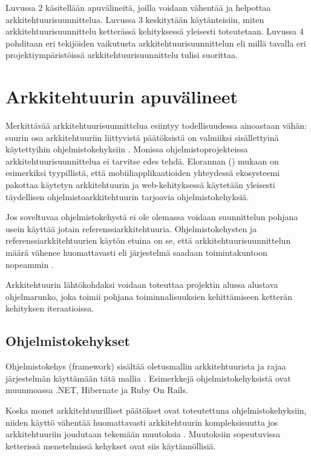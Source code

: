 Luvussa 2 käsitellään apuvälineitä, joilla voidaan vähentää ja helpottaa arkkitehtuurisuunnittelua. Luvussa 3 keskitytään käytänteisiin, miten arkkitehtuurisuunnittelu ketterässä kehityksessä yleisesti toteutetaan. Luvussa 4 pohditaan eri tekijöiden vaikutusta arkkitehtuurisuunnittelun eli millä tavalla eri projektiympäristöissä arkkitehtuurisuunnittelu tulisi suorittaa.

\chapter{Arkkitehtuurin apuvälineet}
Merkittävää arkkitehtuurisuunnittelua esiintyy todellisuudessa ainoastaan vähän: suurin osa arkkitehtuuriin liittyvistä päätöksistä on valmiiksi sisällettyinä käytettyihin ohjelmistokehyksiin \citep{bellomo2014agilely}. Monissa ohjelmistoprojekteissa arkkitehtuurisuunnittelua ei tarvitse edes  tehdä. Elorannan (\citeyear{eloranta2015techniques}) mukaan on esimerkiksi tyypillistä, että mobiiliapplikaatioiden yhteydessä ekosysteemi pakottaa käytetyn arkkitehtuurin ja web-kehityksessä käytetään yleisesti täydellisen ohjelmistoarkkitehtuurin tarjoavia ohjelmistokehyksiä.

Jos soveltuvaa ohjelmistokehystä ei ole olemassa voidaan suunnittelun pohjana usein käyttää jotain referenssiarkkitehtuuria. Ohjelmistokehysten ja referenssiarkkitehtuurien käytön etuina on se, että arkkitehtuurisuunnittelun määrä vähenee huomattavasti eli järjestelmä saadaan toimintakuntoon nopeammin \citep{waterman_how_2015}.

Arkkitehtuurin lähtökohdaksi voidaan toteuttaa projektin alussa alustava ohjelmarunko, joka toimii pohjana toiminnalisuuksien kehittämiseen ketterän kehityksen iteraatioissa.

\section{Ohjelmistokehykset}
Ohjelmistokehys (framework) sisältää oletusmallin arkkitehtuurista ja rajaa järjestelmän käyttämään tätä mallia \citep{waterman_how_2015}. Esimerkkejä ohjelmistokehyksistä ovat muunmoassa .NET, Hibernate ja Ruby On Rails.

Koska monet arkkitehtuurilliset päätökset ovat toteutettuna ohjelmistokehyksiin, niiden käyttö vähentää huomattavasti arkkitehtuurin kompleksisuutta jos arkkitehtuuriin joudutaan tekemään muutoksia \citep{waterman_how_2015}. Muutoksiin sopeutuvissa ketterissä menetelmissä kehykset ovat siis käytännöllisiä.

